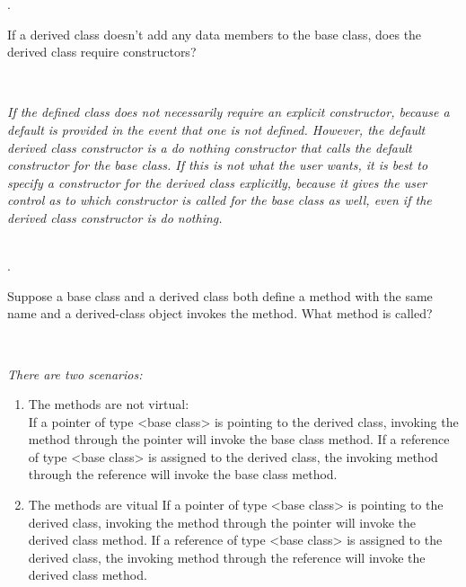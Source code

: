 \documentclass{amsart}
\begin{document}
. 
\begin{minipage}[t]{11.5 cm}
	If a derived class doesn't add any data members to the base class, does the derived class require constructors?
\end{minipage} \\[1ex]
\phantom{3. } 
\begin{minipage}[t]{11.5 cm}
	{\slshape 
	If the defined class does not necessarily require an explicit 
	constructor, because a default is provided in the event that one
	is not defined. 
	However, the default derived class constructor is a do nothing
	constructor that calls the default constructor for the base
	class. 
	If this is not what the user wants, it is best to specify
	a constructor for the derived class explicitly, because it
	gives the user control as to which constructor is called for
	the base class as well, even if the derived class constructor is
	do nothing.
	} 
\end{minipage} 
\\[2ex]

. 
\begin{minipage}[t]{11.5 cm}
	Suppose a base class and a derived class both define a method with the same name and a derived-class object invokes the method. What method is called?
\end{minipage} \\[1ex]
\phantom{3. } 
\begin{minipage}[t]{11.5 cm}
	{\slshape 
	There are two scenarios:
	\begin{enumerate}
		\item The methods are not virtual: \\
			If a pointer of type <base class> is pointing to the 
			derived class, invoking the method through the pointer will
			invoke the base class method. 
			If a reference of type <base class> is assigned to the
			derived class, the invoking method through the reference will
			invoke the base class method.
		\item The methods are vitual
			If a pointer of type <base class> is pointing to the 
			derived class, invoking the method through the pointer will
			invoke the derived class method. 
			If a reference of type <base class> is assigned to the
			derived class, the invoking method through the reference will
			invoke the derived class method.
	\end{enumerate}
	
	} 
\end{minipage} 
\\[2ex]
\end{document}
